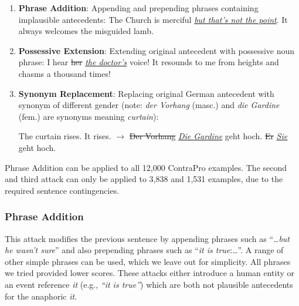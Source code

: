 \begin{enumerate}[noitemsep]
	\item \textbf{Phrase Addition}: Appending and prepending phrases containing implausible antecedents:
	\vspace{.1cm}
	The Church is merciful \emph{\underline{but that's not the point}}. It always welcomes the misguided lamb.
	\vspace{.2cm}
	
	\item \textbf{Possessive Extension}: Extending original antecedent with possessive noun phrase:
	\vspace{.1cm}
	I hear \sout{her} \emph{\underline{the doctor's}} voice! It resounds to me from heights and chasms a thousand times!
	
	\vspace{.2cm}
	\item \textbf{Synonym Replacement}: Replacing original German antecedent with synonym of different gender (note: \emph{der Vorhang} (masc.) and \emph{die Gardine} (fem.) are synonyms meaning \emph{curtain}):
	
	The curtain rises. It rises. $\rightarrow$ \sout{Der Vorhang} \emph{\underline{Die Gardine}} geht hoch. \sout{Er} \emph{\underline{Sie}} geht hoch.
\end{enumerate}


Phrase Addition can be applied to all 12,000 ContraPro examples. 
%
The second and third attack can only be applied to 3,838 and 1,531 examples, due to the required sentence contingencies.  

\subsubsection{Phrase Addition}
This attack modifies the previous sentence
by appending phrases such as ``\dots{}\textit{but he wasn't sure}'' and also prepending phrases such as ``\emph{it is true}:\dots{}''.
%
A range of other simple phrases can be used, which we leave out for simplicity.  All phrases we tried provided lower scores.
%
These attacks either introduce a human entity or an event reference \textit{it} (e.g.,  \textit{``it is true''}) which are both not plausible antecedents for the anaphoric \textit{it}.

